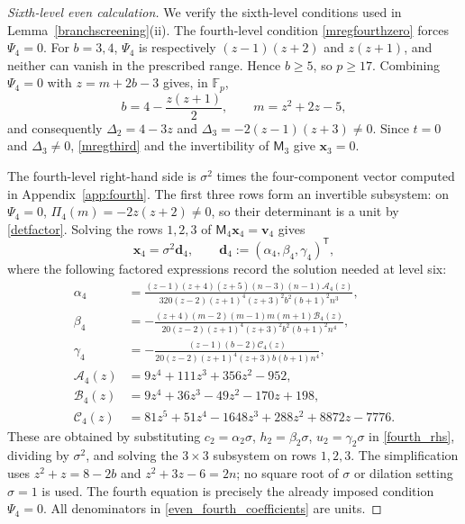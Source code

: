 \documentclass[10pt,a4paper]{amsart}
\newcommand{\F}{\mathbb{F}_p}
\begin{document}
\begin{proof}[Sixth-level even calculation]
We verify the sixth-level conditions used in
Lemma~\ref{branchscreening}(ii).  The fourth-level condition \eqref{mregfourthzero} forces $\Psi_4=0$.
For $b=3,4$, $\Psi_4$ is respectively $(z-1)(z+2)$ and $z(z+1)$,
and neither can vanish in the prescribed range.  Hence $b\ge5$,
so $p\ge17$.  Combining $\Psi_4=0$ with $z=m+2b-3$ gives, in $\F$,
\begin{equation}\label{q4curve}
 b=4-\frac{z(z+1)}2,\qquad m=z^2+2z-5,
\end{equation}
and consequently $\Delta_2=4-3z$ and
$\Delta_3=-2(z-1)(z+3)\ne0$.  Since $t=0$ and $\Delta_3\ne0$, \eqref{mregthird} and the invertibility
of $\mathsf M_3$ give $\mathbf x_3=0$.

The fourth-level right-hand side is $\sigma^2$ times the
four-component vector computed in Appendix~\ref{app:fourth}.  The first
three rows form an invertible subsystem: on $\Psi_4=0$,
$\Pi_4(m)=-2z(z+2)\ne0$, so their determinant is a unit by \eqref{detfactor}.
Solving the rows $1,2,3$ of $\mathsf M_4\mathbf x_4=\mathbf v_4$ gives
\begin{equation}\label{even_fourth_state}
 \mathbf x_4=\sigma^2\mathbf d_4,\qquad
 \mathbf d_4:=(\alpha_4,\beta_4,\gamma_4)^{\mathsf T},
\end{equation}
where the following factored expressions record the solution needed
at level six:
\begin{equation}\label{even_fourth_coefficients}
\begin{aligned}
 \alpha_4&=
 \frac{(z-1)(z+4)(z+5)(n-3)(n-1)\mathcal A_4(z)}
 {320(z-2)(z+1)^4(z+3)^2b^2(b+1)^2n^3},\\
 \beta_4&=-
 \frac{(z+4)(m-2)(m-1)m(m+1)\mathcal B_4(z)}
 {20(z-2)(z+1)^4(z+3)^2b^2(b+1)^2n^4},\\
 \gamma_4&=-
 \frac{(z-1)(b-2)\mathcal C_4(z)}
 {20(z-2)(z+1)^4(z+3)b(b+1)n^4},\\
 \mathcal A_4(z)&=9z^4+111z^3+356z^2-952,\\
 \mathcal B_4(z)&=9z^4+36z^3-49z^2-170z+198,\\
 \mathcal C_4(z)&=81z^5+51z^4-1648z^3+288z^2+8872z-7776.
\end{aligned}
\end{equation}
These are obtained by substituting
$c_2=\alpha_2\sigma$, $h_2=\beta_2\sigma$, $u_2=\gamma_2\sigma$
in \eqref{fourth_rhs}, dividing by $\sigma^2$, and solving the $3\times3$ subsystem on rows $1,2,3$.
The simplification uses $z^2+z=8-2b$ and $z^2+3z-6=2n$;
no square root of $\sigma$ or dilation setting $\sigma=1$ is used.
The fourth equation is precisely the already imposed condition $\Psi_4=0$.
All denominators in \eqref{even_fourth_coefficients} are units.


\end{proof}
\end{document}
